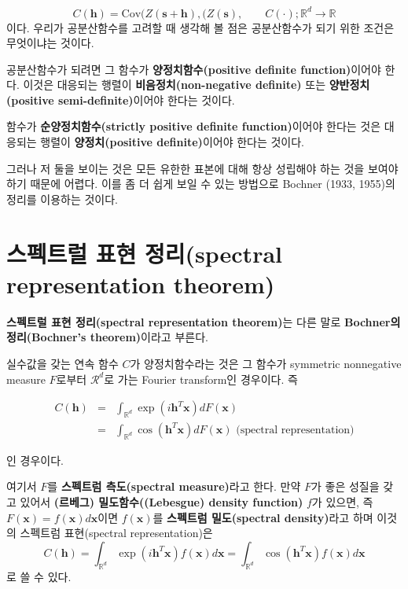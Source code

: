 \documentclass[b5paper,]{scrbook}
\theoremstyle{plain}
\theoremstyle{definition}
\numberwithin{equation}{section}
\let\BeginKnitrBlock\begin \let\EndKnitrBlock\end
\begin{document}
\[C(\mathbf{h})=\text{Cov}(Z(\mathbf{s}+\mathbf{h}), (Z(\mathbf{s}), \qquad{C(\cdot); \mathbb{R}^{d} \rightarrow \mathbb{R}}\]
이다. 우리가 공분산함수를 고려할 때 생각해 볼 점은 공분산함수가 되기
위한 조건은 무엇이냐는 것이다.

공분산함수가 되려면 그 함수가 \textbf{양정치함수(positive definite
function)}이어야 한다. 이것은 대응되는 행렬이
\textbf{비음정치(non-negative definite)} 또는 \textbf{양반정치(positive
semi-definite)}이어야 한다는 것이다.

함수가 \textbf{순양정치함수(strictly positive definite function)}이어야
한다는 것은 대응되는 행렬이 \textbf{양정치(positive definite)}이어야
한다는 것이다.

그러나 저 둘을 보이는 것은 모든 유한한 표본에 대해 항상 성립해야 하는
것을 보여야하기 때문에 어렵다. 이를 좀 더 쉽게 보일 수 있는 방법으로
Bochner (1933, 1955)의 정리를 이용하는 것이다.

\section{스펙트럴 표현 정리(spectral representation
theorem)}\label{--spectral-representation-theorem}

\textbf{스펙트럴 표현 정리(spectral representation theorem)}는 다른 말로
\textbf{Bochner의 정리(Bochner's theorem)}이라고 부른다.

\BeginKnitrBlock{theorem}[스펙트럴 표현 정리]
\protect\hypertarget{thm:unnamed-chunk-188}{}{\label{thm:unnamed-chunk-188}
{} }실수값을 갖는 연속 함수 \(C\)가
양정치함수라는 것은 그 함수가 symmetric nonnegative measure \(F\)로부터
\(\mathcal{R}^{d}\)로 가는 Fourier transform인 경우이다. 즉

\begin{eqnarray}
C(\mathbf{h})&=&\int_{\mathbb{R}^{d}}\exp(i\mathbf{h}^{T}\mathbf{x})dF(\mathbf{x})\nonumber\\
&=&\int_{\mathbb{R}^{d}}\cos(\mathbf{h}^{T}\mathbf{x})dF(\mathbf{x}) \text{ (spectral representation)}
\end{eqnarray}

인 경우이다.
\EndKnitrBlock{theorem}

여기서 \(F\)를 \textbf{스펙트럼 측도(spectral measure)}라고 한다. 만약
\(F\)가 좋은 성질을 갖고 있어서 \textbf{(르베그) 밀도함수((Lebesgue)
density function)} \(f\)가 있으면, 즉
\(F(\mathbf{x})=f(\mathbf{x})d\mathbf{x}\)이면 \(f(\mathbf{x})\)를
\textbf{스펙트럼 밀도(spectral density)}라고 하며 이것의 스펙트럼
표현(spectral representation)은 \[
C(\mathbf{h})=\int_{\mathbb{R}^{d}}\exp(i\mathbf{h}^{T}\mathbf{x})f(\mathbf{x})d\mathbf{x}=\int_{\mathbb{R}^{d}}\cos(\mathbf{h}^{T}\mathbf{x})f(\mathbf{x})d\mathbf{x}
\] 로 쓸 수 있다.
\end{document}
